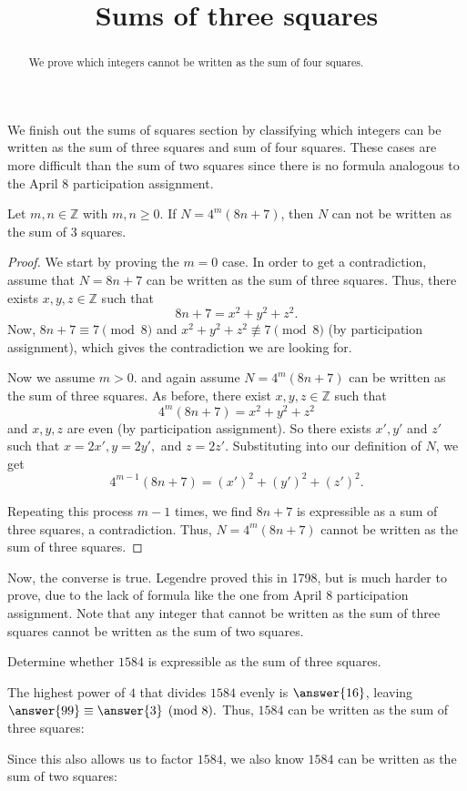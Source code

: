 \documentclass{ximera}
\title{Sums of three squares}
\begin{document}
  
\begin{abstract}  We prove which integers cannot be written as the sum of four squares.
\end{abstract}
\maketitle  

We finish out the sums of squares section by classifying which integers can be written as the sum of three squares and sum of four squares. These cases are more difficult than the sum of two squares since there is no formula analogous to the April 8 participation assignment.

\begin{theorem}
Let $m,n\in\mathbb{Z}$ with $m,n\geq0$. If $N=4^m(8n+7)$, then $N$ can not be written as the sum of $3$ squares.
\end{theorem}
\begin{proof}
 We start by proving the $m=0$ case. In order to get a contradiction, assume that $N=8n+7$ can be written as the sum of three squares. Thus, there exists $x,y,z\in\mathbb{Z}$ such that \[8n+7=x^2+y^2+z^2.\]
 Now, $8n+7\equiv 7\pmod8$ and $x^2+y^2+z^2\not\equiv7\pmod 8$ (by participation assignment), which gives the contradiction we are looking for.

Now we assume $m>0$. and again assume $N=4^m(8n+7)$ can be written as the sum of three squares. As before, there exist $x,y,z\in\mathbb{Z}$ such that \[4^m(8n+7)=x^2+y^2+z^2\] and $x,y,z$ are even (by participation assignment). So there exists $x',y'$ and $z'$ such that $x=2x', y=2y',$ and $z=2z'$. Substituting into our definition of $N$, we get \[4^{m-1}(8n+7)=(x')^2+(y')^2+(z')^2.\]

Repeating  this process $m-1$ times, we find $8n+7$ is expressible as a sum of three squares, a contradiction. Thus, $N=4^m(8n+7)$ cannot be written as the sum of three squares.
\end{proof}

Now, the converse is true. Legendre proved this in 1798, but is much harder to prove, due to the lack of formula like the one from April 8 participation assignment. Note that any integer that cannot be written as the sum of three squares cannot be written as the sum of two squares.

\begin{example}
 Determine whether $1584$ is expressible as the sum of three squares. 
 
 The highest power of $4$ that divides $1584$ evenly is $\answer{16}$, leaving $\answer{99}\equiv\answer{3} \pmod 8.$ Thus, $1584$ can be written as the sum of three squares:
\begin{multipleChoice}
\end{multipleChoice}

Since this also allows us to factor $1584$, we  also know $1584$ can be written as the sum of two squares:
\begin{multipleChoice}
\end{multipleChoice}
\end{example}
\end{document}
